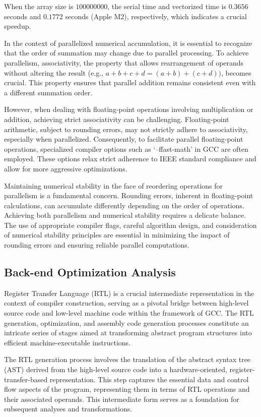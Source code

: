 \documentclass[conference]{IEEEtran}
\begin{document}
When the array size is $100000000$, the serial time and vectorized time is $0.3656$ seconds and $0.1772$ seconds (Apple M2), respectively, which indicates a crucial speedup.

In the context of parallelized numerical accumulation, it is essential to recognize that the order of summation may change due to parallel processing. To achieve parallelism, associativity, the property that allows rearrangement of operands without altering the result (e.g., $a+b+c+d=(a+b)+(c+d))$, becomes crucial. This property ensures that parallel addition remains consistent even with a different summation order.

However, when dealing with floating-point operations involving multiplication or addition, achieving strict associativity can be challenging. Floating-point arithmetic, subject to rounding errors, may not strictly adhere to associativity, especially when parallelized. Consequently, to facilitate parallel floating-point operations, specialized compiler options such as `--ffast-math' in GCC are often employed. These options relax strict adherence to IEEE standard compliance and allow for more aggressive optimizations.

Maintaining numerical stability in the face of reordering operations for parallelism is a fundamental concern. Rounding errors, inherent in floating-point calculations, can accumulate differently depending on the order of operations. Achieving both parallelism and numerical stability requires a delicate balance. The use of appropriate compiler flags, careful algorithm design, and consideration of numerical stability principles are essential in minimizing the impact of rounding errors and ensuring reliable parallel computations.

\subsection{Back-end Optimization Analysis}

Register Transfer Language (RTL) is a crucial intermediate representation in the context of compiler construction, serving as a pivotal bridge between high-level source code and low-level machine code within the framework of GCC. The RTL generation, optimization, and assembly code generation processes constitute an intricate series of stages aimed at transforming abstract program structures into efficient machine-executable instructions.

The RTL generation process involves the translation of the abstract syntax tree (AST) derived from the high-level source code into a hardware-oriented, register-transfer-based representation. This step captures the essential data and control flow aspects of the program, representing them in terms of RTL operations and their associated operands. This intermediate form serves as a foundation for subsequent analyses and transformations.
\end{document}
